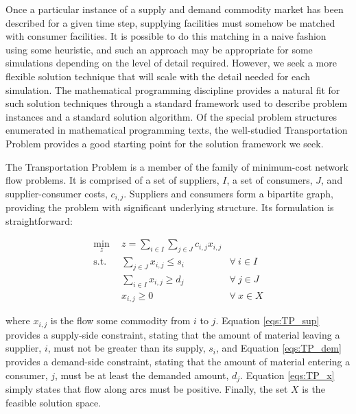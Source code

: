 Once a particular instance of a supply and demand commodity market has been
described for a given time step, supplying facilities must somehow be matched
with consumer facilities. It is possible to do this matching in a naive fashion
using some heuristic, and such an approach may be appropriate for some
simulations depending on the level of detail required. However, we seek a more
flexible solution technique that will scale with the detail needed for each
simulation. The mathematical programming discipline provides a natural fit for
such solution techniques through a standard framework used to describe problem
instances and a standard solution algorithm. Of the special problem structures
enumerated in mathematical programming texts, the well-studied Transportation
Problem provides a good starting point for the solution framework we seek.

The Transportation Problem is a member of the family of minimum-cost network
flow problems. It is comprised of a set of suppliers, $I$, a set of consumers,
$J$, and supplier-consumer costs, $c_{i,j}$. Suppliers and consumers form a
bipartite graph, providing the problem with significant underlying
structure. Its formulation is straightforward:

\begin{subequations}\label{eqs:TP}
  \begin{align}
    \min_{z} \:\: & 
    z = \sum_{i \in I}\sum_{j \in J} c_{i,j} x_{i,j} 
    & \label{eqs:TP_obj} \\
    \text{s.t.} \:\: &
    \sum_{j \in J} x_{i,j} \leq s_{i} 
    &
    \forall \: i \in I \label{eqs:TP_sup} \\
    &
    \sum_{i \in I} x_{i,j} \geq d_{j} 
    & 
    \forall \: j \in J \label{eqs:TP_dem} \\
    &
    x_{i,j} \geq 0
    &
    \forall \: x \in X \label{eqs:TP_x}
  \end{align}
\end{subequations}

where $x_{i,j}$ is the flow some commodity from $i$ to $j$. 
Equation \ref{eqs:TP_sup} provides a supply-side constraint, stating that
the amount of material leaving a supplier, $i$, must not be greater than its
supply, $s_i$, and Equation \ref{eqs:TP_dem} provides a demand-side constraint,
stating that the amount of material entering a consumer, $j$, must be at least
the demanded amount, $d_j$. Equation \ref{eqs:TP_x} simply states that flow
along arcs must be positive. Finally, the set $X$ is the feasible solution
space.

